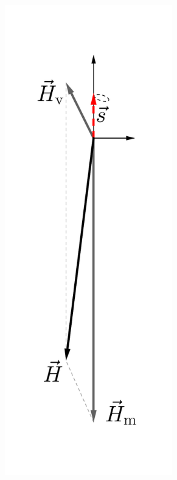 \begin{figure}[htbp]
	\centering
	\begin{subfigure}[t]{0.3\textwidth}
		\centering
		\includegraphics[width=0.8\textwidth]{chapters/assets/matter/matter-effect-large-density}

\end{subfigure}
\end{figure}
